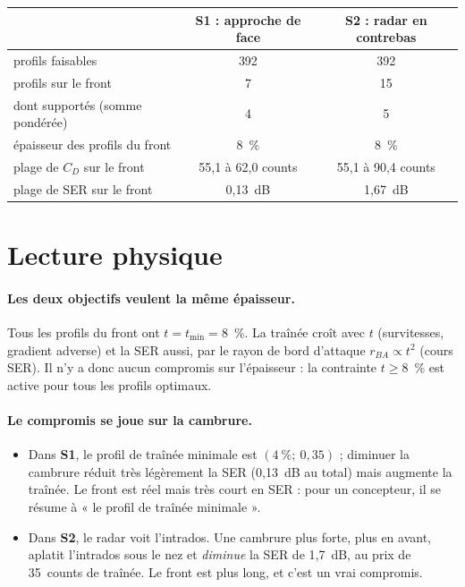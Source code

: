 \begin{center}
\begin{tabular}{lcc}
\toprule
 & S1 : approche de face & S2 : radar en contrebas \\
\midrule
profils faisables & 392 & 392 \\
profils sur le front & 7 & 15 \\
dont supportés (somme pondérée) & 4 & 5 \\
épaisseur des profils du front & 8~\% & 8~\% \\
plage de $C_D$ sur le front & 55,1 à 62,0 counts & 55,1 à 90,4 counts \\
plage de SER sur le front & 0,13~dB & 1,67~dB \\
\bottomrule
\end{tabular}
\end{center}

\section{Lecture physique}
\paragraph{Les deux objectifs veulent la même épaisseur.} Tous les profils du front ont $t=t_{\min}=8$~\%. La traînée croît avec $t$ (survitesses, gradient adverse) et la SER aussi, par le rayon de bord d'attaque $r_{BA}\propto t^2$ (cours SER). Il n'y a donc aucun compromis sur l'épaisseur : la contrainte $t\ge8$~\% est active pour tous les profils optimaux.

\paragraph{Le compromis se joue sur la cambrure.}
\begin{itemize}
\item Dans \textbf{S1}, le profil de traînée minimale est $(4~\%;\ 0{,}35)$ ; diminuer la cambrure réduit très légèrement la SER (0,13~dB au total) mais augmente la traînée. Le front est réel mais très court en SER : pour un concepteur, il se résume à « le profil de traînée minimale ».
\item Dans \textbf{S2}, le radar voit l'intrados. Une cambrure plus forte, plus en avant, aplatit l'intrados sous le nez et \emph{diminue} la SER de 1,7~dB, au prix de 35~counts de traînée. Le front est plus long, et c'est un vrai compromis.
\end{itemize}

